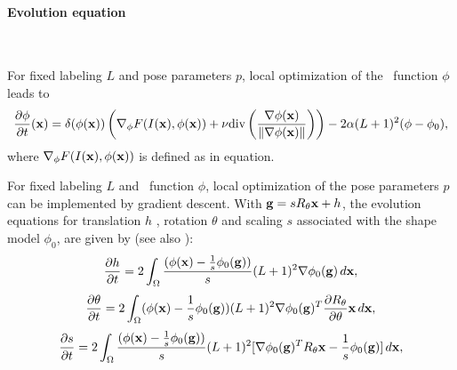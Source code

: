 \paragraph{Evolution equation}
~\par \vspace{0.3cm}
For fixed labeling $L$ and pose parameters $p$, local optimization of the \ls~function $\phi$ leads to
\begin{equation}
  \label{eq:evol_cremers2003b}
  \frac{\partial \phi}{\partial t}(\mathbf{x}) = \delta(\phi(\mathbf{x})) \left( \nabla_\phi F(I(\mathbf{x}), \phi(\mathbf{x})) + \nu \text{div}\left(\frac{\nabla \phi(\mathbf{x})}{\|\nabla \phi(\mathbf{x})\|}\right) \right) - 2\alpha (L + 1)^2(\phi - \phi_0),
\end{equation}
where $\nabla_\phi F(I(\mathbf{x}),\phi(\mathbf{x}))$ is defined as in equation.

For fixed labeling $L$ and \ls~function $\phi$, local optimization of the pose parameters $p$ can be implemented by gradient descent. With $\mathbf{g} = s R_\theta \mathbf{x} + h$, the evolution equations for translation $h$ , rotation $\theta$ and scaling $s$ associated with the shape model $\phi_0$, are given by (see also \cite{Cremers2006}):
\begin{equation}
  \label{eq:h_evol_cremers2003b}
  \frac{\partial h}{\partial t} =  2\int_\Omega \frac{(\phi(\mathbf{x}) - \frac{1}{s}\phi_0(\mathbf{g}))}{s} (L + 1)^2 \nabla\phi_0(\mathbf{g}) \, d\mathbf{x},
\end{equation}
\begin{equation}
  \label{eq:theta_evol_cremers2003b}
  \frac{\partial \theta}{\partial t} =  2\int_\Omega (\phi(\mathbf{x}) - \frac{1}{s}\phi_0(\mathbf{g})) (L + 1)^2 \nabla\phi_0(\mathbf{g})^T \frac{\partial R_\theta}{\partial \theta} \mathbf{x} \, d\mathbf{x},
\end{equation}
\begin{equation}
  \label{eq:s_evol_cremers2003b}
  \frac{\partial s}{\partial t} =  2\int_\Omega \frac{(\phi(\mathbf{x}) - \frac{1}{s}\phi_0(\mathbf{g}))}{s} (L + 1)^2 [\nabla\phi_0(\mathbf{g})^T R_\theta \mathbf{x} - \frac{1}{s}\phi_0(\mathbf{g})] \, d\mathbf{x},
\end{equation}


